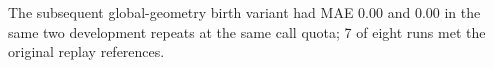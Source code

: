 The subsequent global-geometry birth variant had MAE 0.00 and 0.00 in the same two development repeats at the same call quota; 7 of eight runs met the original replay references. 
